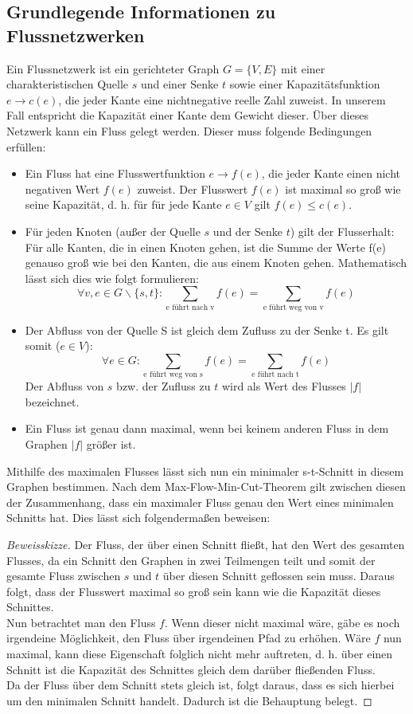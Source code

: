 \documentclass[a4paper, notitlepage, 12pt]{scrartcl}
\begin{document}
 \subsection{Grundlegende Informationen zu Flussnetzwerken}
Ein Flussnetzwerk ist ein gerichteter Graph $G = \{V,E\}$ mit einer charakteristischen Quelle $s$ und einer Senke $t$ sowie einer Kapazitätsfunktion $e \rightarrow c(e)$, die jeder Kante eine nichtnegative reelle Zahl zuweist. In unserem Fall entspricht die Kapazität einer Kante dem Gewicht dieser.
Über dieses Netzwerk kann ein Fluss gelegt werden. Dieser muss folgende Bedingungen erfüllen:
\begin{itemize}
 \item Ein Fluss hat eine Flusswertfunktion $e \rightarrow f(e)$, die jeder Kante einen nicht negativen Wert $f(e)$ zuweist. Der Flusswert $f(e)$ ist maximal so groß wie seine Kapazität, d. h. für für jede Kante $e \in V$ gilt $f(e) \leq c(e)$.
\item Für jeden Knoten (außer der Quelle $s$ und der Senke $t$) gilt der Flusserhalt: Für alle Kanten, die in einen Knoten gehen, ist die Summe der Werte f(e) genauso groß wie bei den Kanten, die aus einem Knoten gehen. Mathematisch lässt sich dies wie folgt formulieren:
\begin{equation} \forall v,e \in G\backslash\{s,t\} : \sum_{\text{e führt nach v}} f(e) = \sum_{\text{e führt weg von v}} f(e) \end{equation}
\item Der Abfluss von der Quelle S ist gleich dem Zufluss zu der Senke t. Es gilt somit ($e \in V$):
\begin{equation} \forall e \in G : \sum_{\text{e führt weg von s}} f(e) = \sum_{\text{e führt nach t}} f(e) \end{equation}
Der Abfluss von $s$ bzw. der Zufluss zu $t$ wird als Wert des Flusses $|f|$ bezeichnet.
\item  Ein Fluss ist genau dann maximal, wenn bei keinem anderen Fluss in dem Graphen $|f|$ größer ist.
\end{itemize}
Mithilfe des maximalen Flusses lässt sich nun ein minimaler s-t-Schnitt in diesem Graphen bestimmen. Nach dem Max-Flow-Min-Cut-Theorem gilt zwischen diesen der Zusammenhang, dass ein maximaler Fluss genau den Wert eines minimalen Schnitts hat. Dies lässt sich folgendermaßen beweisen:
\begin{proof}[Beweisskizze]
Der Fluss, der über einen Schnitt fließt, hat den Wert des gesamten Flusses, da ein Schnitt den Graphen in zwei Teilmengen teilt und somit der gesamte Fluss zwischen $s$ und $t$ über diesen Schnitt geflossen sein muss. Daraus folgt, dass der Flusswert maximal so groß sein kann wie die Kapazität dieses Schnittes. \\
Nun betrachtet man den Fluss $f$. Wenn dieser nicht maximal wäre, gäbe es noch irgendeine Möglichkeit, den Fluss über irgendeinen Pfad zu erhöhen. Wäre $f$ nun maximal, kann diese Eigenschaft folglich nicht mehr auftreten, d. h. über einen Schnitt ist die Kapazität des Schnittes gleich dem darüber
fließenden Fluss. \\ Da der Fluss über dem Schnitt stets gleich ist, folgt daraus, dass es sich hierbei um den
minimalen Schnitt handelt. Dadurch ist die Behauptung belegt.
\end{proof}
\end{document}
